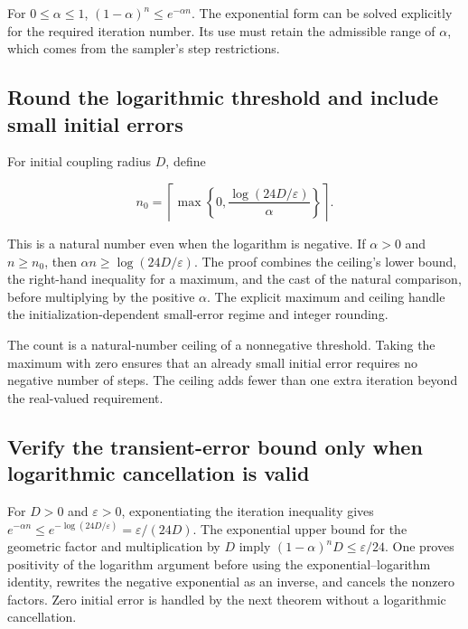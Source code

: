 \documentclass[11pt,a4paper]{report}
\begin{document}
For \(0\le\alpha\le1\), \((1-\alpha)^n\le e^{-\alpha n}\). The exponential form can be solved explicitly for the required iteration number. Its use must retain the admissible range of \(\alpha\), which comes from the sampler’s step restrictions.

\subsection{\texorpdfstring{Round the logarithmic threshold and include small initial errors}{Round the logarithmic threshold and include small initial errors}}
\label{report-step-KineticLangevin-Complexity-lean-2}


For initial coupling radius \(D\), define

\[n_0=\left\lceil\max\left\{0,\frac{\log(24D/\varepsilon)}\alpha\right\}\right\rceil.\]

This is a natural number even when the logarithm is negative. If \(\alpha>0\) and \(n\ge n_0\), then \(\alpha n\ge\log(24D/\varepsilon)\). The proof combines the ceiling's lower bound, the right-hand inequality for a maximum, and the cast of the natural comparison, before multiplying by the positive \(\alpha\). The explicit maximum and ceiling handle the initialization-dependent small-error regime and integer rounding.



The count is a natural-number ceiling of a nonnegative threshold. Taking the maximum with zero ensures that an already small initial error requires no negative number of steps. The ceiling adds fewer than one extra iteration beyond the real-valued requirement.

\subsection{\texorpdfstring{Verify the transient-error bound only when logarithmic cancellation is valid}{Verify the transient-error bound only when logarithmic cancellation is valid}}
\label{report-step-KineticLangevin-Complexity-lean-3}


For \(D>0\) and \(\varepsilon>0\), exponentiating the iteration inequality gives \(e^{-\alpha n}\le e^{-\log(24D/\varepsilon)}=\varepsilon/(24D)\). The exponential upper bound for the geometric factor and multiplication by \(D\) imply \((1-\alpha)^nD\le\varepsilon/24\). One proves positivity of the logarithm argument before using the exponential–logarithm identity, rewrites the negative exponential as an inverse, and cancels the nonzero factors. Zero initial error is handled by the next theorem without a logarithmic cancellation.
\end{document}
